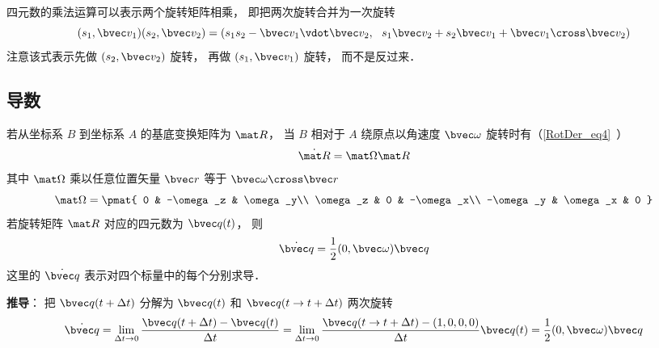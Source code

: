 四元数的乘法运算可以表示两个旋转矩阵相乘， 即把两次旋转合并为一次旋转
\begin{equation}
(s_1, \bvec v_1) (s_2, \bvec v_2) = (s_1 s_2 - \bvec v_1 \vdot \bvec v_2,\ \ s_1 \bvec v_2 + s_2 \bvec v_1 + \bvec v_1 \cross \bvec v_2)
\end{equation}
注意该式表示先做 $(s_2, \bvec v_2)$ 旋转， 再做 $(s_1, \bvec v_1)$ 旋转， 而不是反过来．

\subsection{导数}
若从坐标系 $B$ 到坐标系 $A$ 的基底变换矩阵为 $\mat R$， 当 $B$ 相对于 $A$ 绕原点以角速度 $\bvec \omega$ 旋转时有（\autoref{RotDer_eq4}~）
\begin{equation}
\dot{\mat R} = \mat \Omega \mat R
\end{equation}
其中 $\mat\Omega$ 乘以任意位置矢量 $\bvec r$ 等于 $\bvec \omega \cross \bvec r$
\begin{equation}
\mat \Omega = \pmat{
0 & -\omega_z & \omega_y\\
\omega_z & 0 & -\omega_x\\
-\omega_y & \omega_x & 0
}\end{equation}
若旋转矩阵 $\mat R$ 对应的四元数为 $\bvec q(t)$， 则
\begin{equation}\label{QuatN_eq1}
\dot {\bvec q} = \frac12 (0, \bvec \omega) \bvec q
\end{equation}
这里的 $\dot{\bvec q}$ 表示对四个标量中的每个分别求导．

\textbf{推导}： 把 ${\bvec q}(t+\Delta t)$ 分解为 ${\bvec q}(t)$ 和 ${\bvec q}(t\to t +\Delta t)$ 两次旋转
\begin{equation}
\dot {\bvec q}
= \lim_{\Delta t\to 0}\frac{{\bvec q}(t+\Delta t) - {\bvec q}(t)}{\Delta t}
= \lim_{\Delta t\to 0}\frac{{\bvec q}(t\to t +\Delta t) - (1,0,0,0)}{\Delta t}\bvec q(t)
= \frac{1}{2} (0, \bvec \omega)\bvec q
\end{equation}

